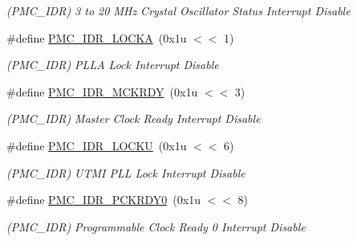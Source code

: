 \begin{DoxyCompactItemize}
\begin{DoxyCompactList}\small\item\em (P\+M\+C\+\_\+\+I\+DR) 3 to 20 M\+Hz Crystal Oscillator Status Interrupt Disable \end{DoxyCompactList}\item 
\mbox{\label{group__SAMS70__PMC_ga0379bad346c549e83793fb36f3705cd1}} 
\#define \mbox{\hyperlink{group__SAMS70__PMC_ga0379bad346c549e83793fb36f3705cd1}{P\+M\+C\+\_\+\+I\+D\+R\+\_\+\+L\+O\+C\+KA}}~(0x1u $<$$<$ 1)
\begin{DoxyCompactList}\small\item\em (P\+M\+C\+\_\+\+I\+DR) P\+L\+LA Lock Interrupt Disable \end{DoxyCompactList}\item 
\mbox{\label{group__SAMS70__PMC_gad923488932cac3d9d6f156b7ccc78e52}} 
\#define \mbox{\hyperlink{group__SAMS70__PMC_gad923488932cac3d9d6f156b7ccc78e52}{P\+M\+C\+\_\+\+I\+D\+R\+\_\+\+M\+C\+K\+R\+DY}}~(0x1u $<$$<$ 3)
\begin{DoxyCompactList}\small\item\em (P\+M\+C\+\_\+\+I\+DR) Master Clock Ready Interrupt Disable \end{DoxyCompactList}\item 
\mbox{\label{group__SAMS70__PMC_ga313fb194776f6a326f91150df714f990}} 
\#define \mbox{\hyperlink{group__SAMS70__PMC_ga313fb194776f6a326f91150df714f990}{P\+M\+C\+\_\+\+I\+D\+R\+\_\+\+L\+O\+C\+KU}}~(0x1u $<$$<$ 6)
\begin{DoxyCompactList}\small\item\em (P\+M\+C\+\_\+\+I\+DR) U\+T\+MI P\+LL Lock Interrupt Disable \end{DoxyCompactList}\item 
\mbox{\label{group__SAMS70__PMC_gac6c95ab23e8b9ad179d3db96fa6c5d7b}} 
\#define \mbox{\hyperlink{group__SAMS70__PMC_gac6c95ab23e8b9ad179d3db96fa6c5d7b}{P\+M\+C\+\_\+\+I\+D\+R\+\_\+\+P\+C\+K\+R\+D\+Y0}}~(0x1u $<$$<$ 8)
\begin{DoxyCompactList}\small\item\em (P\+M\+C\+\_\+\+I\+DR) Programmable Clock Ready 0 Interrupt Disable \end{DoxyCompactList}\item 
\mbox{\label{group__SAMS70__PMC_ga41d50baa84ca59665f79584f6c769f54}} 

\end{DoxyCompactItemize}
